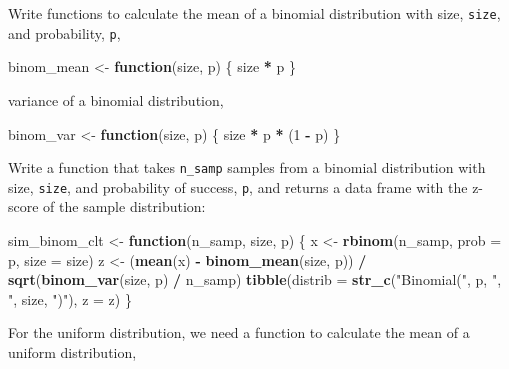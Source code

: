 \documentclass[]{book}
\newenvironment{Shaded}{\begin{snugshade}}{\end{snugshade}}
\newcommand{\ControlFlowTok}[1]{\textcolor[rgb]{0.13,0.29,0.53}{\textbf{#1}}}
\newcommand{\DataTypeTok}[1]{\textcolor[rgb]{0.13,0.29,0.53}{#1}}
\newcommand{\DecValTok}[1]{\textcolor[rgb]{0.00,0.00,0.81}{#1}}
\newcommand{\KeywordTok}[1]{\textcolor[rgb]{0.13,0.29,0.53}{\textbf{#1}}}
\newcommand{\NormalTok}[1]{#1}
\newcommand{\OperatorTok}[1]{\textcolor[rgb]{0.81,0.36,0.00}{\textbf{#1}}}
\newcommand{\StringTok}[1]{\textcolor[rgb]{0.31,0.60,0.02}{#1}}
\theoremstyle{definition}
\theoremstyle{definition}
\theoremstyle{definition}
\theoremstyle{remark}
\begin{document}
Write functions to calculate the mean of a binomial distribution with
size, \texttt{size}, and probability, \texttt{p},

\begin{Shaded}
\begin{Highlighting}[]
\NormalTok{binom_mean <-}\StringTok{ }\ControlFlowTok{function}\NormalTok{(size, p) \{}
\NormalTok{  size }\OperatorTok{*}\StringTok{ }\NormalTok{p}
\NormalTok{\}}
\end{Highlighting}
\end{Shaded}

variance of a binomial distribution,

\begin{Shaded}
\begin{Highlighting}[]
\NormalTok{binom_var <-}\StringTok{ }\ControlFlowTok{function}\NormalTok{(size, p) \{}
\NormalTok{  size }\OperatorTok{*}\StringTok{ }\NormalTok{p }\OperatorTok{*}\StringTok{ }\NormalTok{(}\DecValTok{1} \OperatorTok{-}\StringTok{ }\NormalTok{p)}
\NormalTok{\}}
\end{Highlighting}
\end{Shaded}

Write a function that takes \texttt{n\_samp} samples from a binomial
distribution with size, \texttt{size}, and probability of success,
\texttt{p}, and returns a data frame with the z-score of the sample
distribution:

\begin{Shaded}
\begin{Highlighting}[]
\NormalTok{sim_binom_clt <-}\StringTok{ }\ControlFlowTok{function}\NormalTok{(n_samp, size, p) \{}
\NormalTok{  x <-}\StringTok{ }\KeywordTok{rbinom}\NormalTok{(n_samp, }\DataTypeTok{prob =}\NormalTok{ p, }\DataTypeTok{size =}\NormalTok{ size)}
\NormalTok{  z <-}\StringTok{ }\NormalTok{(}\KeywordTok{mean}\NormalTok{(x) }\OperatorTok{-}\StringTok{ }\KeywordTok{binom_mean}\NormalTok{(size, p)) }\OperatorTok{/}
\StringTok{    }\KeywordTok{sqrt}\NormalTok{(}\KeywordTok{binom_var}\NormalTok{(size, p) }\OperatorTok{/}\StringTok{ }\NormalTok{n_samp)}
  \KeywordTok{tibble}\NormalTok{(}\DataTypeTok{distrib =} \KeywordTok{str_c}\NormalTok{(}\StringTok{"Binomial("}\NormalTok{, p, }\StringTok{", "}\NormalTok{, size, }\StringTok{")"}\NormalTok{),}
         \DataTypeTok{z =}\NormalTok{ z)}
\NormalTok{\}}
\end{Highlighting}
\end{Shaded}

For the uniform distribution, we need a function to calculate the mean
of a uniform distribution,
\end{document}
